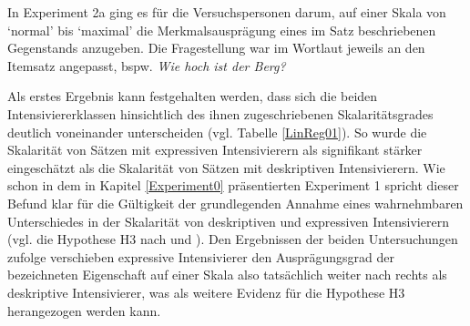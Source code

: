 In Experiment 2a ging es für die Versuchspersonen darum, auf einer Skala von `normal' bis `maximal' die Merkmalsausprägung eines im Satz beschriebenen Gegenstands anzugeben. Die Fragestellung war im Wortlaut jeweils an den Itemsatz angepasst, bspw. \textit{Wie hoch ist der Berg?}


Als erstes Ergebnis kann festgehalten werden, dass sich die beiden Intensiviererklassen hinsichtlich des ihnen zugeschriebenen Skalaritätsgrades deutlich voneinander unterscheiden (vgl. Tabelle \ref{LinReg01}). So wurde die Skalarität von Sätzen mit expressiven Intensivierern als signifikant stärker eingeschätzt als die Skalarität von Sätzen mit deskriptiven Intensivierern. Wie schon in dem in {Kapitel \ref{Experiment0}} präsentierten Experiment 1 spricht dieser Befund klar für die Gültigkeit der grundlegenden Annahme eines wahrnehmbaren Unterschiedes in der Skalarität von deskriptiven und expressiven Intensivierern (vgl. die {Hypothese H3} nach {\citealt[22]{Paradis.1997}} und {\citealt[133]{Gutzmann.2019a}}). Den Ergebnissen der beiden Untersuchungen zufolge verschieben expressive Intensivierer den Ausprägungsgrad der bezeichneten Eigenschaft auf einer Skala also tatsächlich weiter nach rechts als deskriptive Intensivierer, was als weitere Evidenz für die Hypothese H3 herangezogen {werden kann}.



